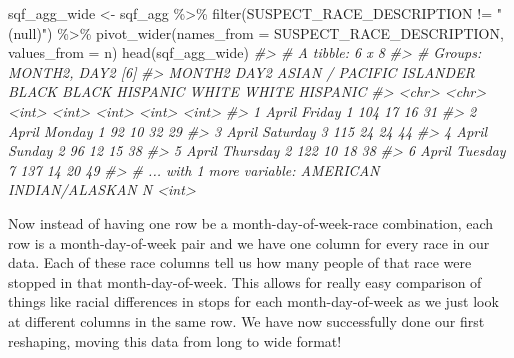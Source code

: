\documentclass[
]{krantz}
\makeatletter
\newenvironment{Shaded}{\begin{snugshade}}{\end{snugshade}}
\newcommand{\AttributeTok}[1]{\textcolor[rgb]{0.61,0.61,0.61}{#1}}
\newcommand{\CommentTok}[1]{\textcolor[rgb]{0.37,0.37,0.37}{\textit{#1}}}
\newcommand{\FunctionTok}[1]{\textcolor[rgb]{0,0,0}{#1}}
\newcommand{\NormalTok}[1]{#1}
\newcommand{\OtherTok}[1]{\textcolor[rgb]{0.37,0.37,0.37}{#1}}
\newcommand{\SpecialCharTok}[1]{\textcolor[rgb]{0,0,0}{#1}}
\newcommand{\StringTok}[1]{\textcolor[rgb]{0.5,0.5,0.5}{#1}}
\newenvironment{kframe}{%
\medskip{}
\setlength{\fboxsep}{.8em}
 \def\at@end@of@kframe{}%
 \ifinner\ifhmode%
  \def\at@end@of@kframe{\end{minipage}}%
  \begin{minipage}{\columnwidth}%
 \fi\fi%
 \def\FrameCommand##1{\hskip\@totalleftmargin \hskip-\fboxsep
 \colorbox{shadecolor}{##1}\hskip-\fboxsep
     \hskip-\linewidth \hskip-\@totalleftmargin \hskip\columnwidth}%
 \MakeFramed {\advance\hsize-\width
   \@totalleftmargin\z@ \linewidth\hsize
   \@setminipage}}%
 {\par\unskip\endMakeFramed%
 \at@end@of@kframe}
\renewenvironment{Shaded}{\begin{kframe}}{\end{kframe}}
\makeatother
\begin{document}
\begin{Shaded}
\begin{Highlighting}[]
\NormalTok{sqf\_agg\_wide }\OtherTok{\textless{}{-}}\NormalTok{ sqf\_agg }\SpecialCharTok{\%\textgreater{}\%}
  \FunctionTok{filter}\NormalTok{(SUSPECT\_RACE\_DESCRIPTION }\SpecialCharTok{!=} \StringTok{"(null)"}\NormalTok{) }\SpecialCharTok{\%\textgreater{}\%}
  \FunctionTok{pivot\_wider}\NormalTok{(}\AttributeTok{names\_from =}\NormalTok{ SUSPECT\_RACE\_DESCRIPTION, }\AttributeTok{values\_from =}\NormalTok{ n) }
\FunctionTok{head}\NormalTok{(sqf\_agg\_wide)}
\CommentTok{\#\textgreater{} \# A tibble: 6 x 8}
\CommentTok{\#\textgreater{} \# Groups:   MONTH2, DAY2 [6]}
\CommentTok{\#\textgreater{}   MONTH2 DAY2     \textasciigrave{}ASIAN / PACIFIC ISLANDER\textasciigrave{} BLACK \textasciigrave{}BLACK HISPANIC\textasciigrave{} WHITE \textasciigrave{}WHITE HISPANIC\textasciigrave{}}
\CommentTok{\#\textgreater{}   \textless{}chr\textgreater{}  \textless{}chr\textgreater{}                         \textless{}int\textgreater{} \textless{}int\textgreater{}            \textless{}int\textgreater{} \textless{}int\textgreater{}            \textless{}int\textgreater{}}
\CommentTok{\#\textgreater{} 1 April  Friday                            1   104               17    16               31}
\CommentTok{\#\textgreater{} 2 April  Monday                            1    92               10    32               29}
\CommentTok{\#\textgreater{} 3 April  Saturday                          3   115               24    24               44}
\CommentTok{\#\textgreater{} 4 April  Sunday                            2    96               12    15               38}
\CommentTok{\#\textgreater{} 5 April  Thursday                          2   122               10    18               38}
\CommentTok{\#\textgreater{} 6 April  Tuesday                           7   137               14    20               49}
\CommentTok{\#\textgreater{} \# ... with 1 more variable: AMERICAN INDIAN/ALASKAN N \textless{}int\textgreater{}}
\end{Highlighting}
\end{Shaded}

Now instead of having one row be a month-day-of-week-race combination, each row is a month-day-of-week pair and we have one column for every race in our data. Each of these race columns tell us how many people of that race were stopped in that month-day-of-week. This allows for really easy comparison of things like racial differences in stops for each month-day-of-week as we just look at different columns in the same row. We have now successfully done our first reshaping, moving this data from long to wide format!
\end{document}

